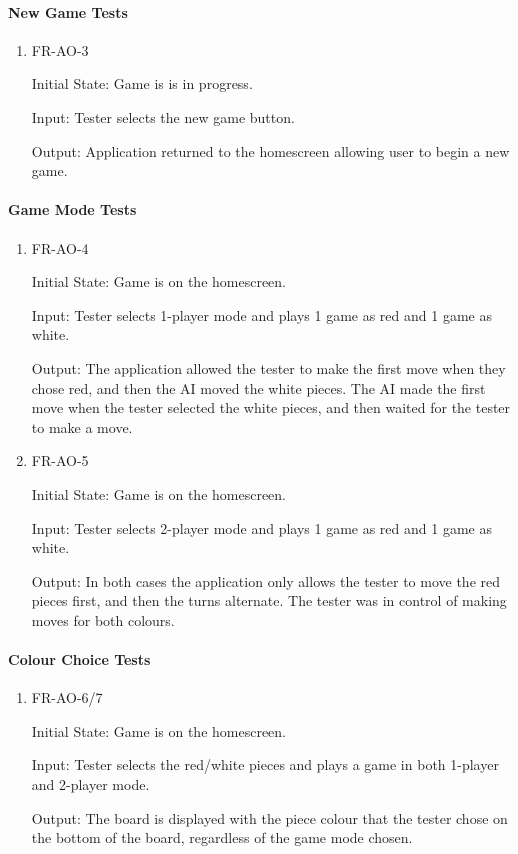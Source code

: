 \documentclass[12pt, titlepage]{article}
\begin{document}
\paragraph{New Game Tests}
\begin{enumerate}
    \item{FR-AO-3}
            
    Initial State: Game is is in progress.
    
    Input: Tester selects the new game button.
    
    Output: Application returned to the homescreen allowing user to begin a new game.
\end{enumerate}

\paragraph{Game Mode Tests}
\begin{enumerate}
    \item{FR-AO-4}
            
    Initial State: Game is on the homescreen.
    
    Input: Tester selects 1-player mode and plays 1 game as red and 1 game as white.
    
    Output: The application allowed the tester to make the first move when they chose red, and then the AI moved the white pieces. The AI made the first move when the tester selected the white pieces, and then waited for the tester to make a move. 
    \item{FR-AO-5}
                
    Initial State: Game is on the homescreen.
    
    Input: Tester selects 2-player mode and plays 1 game as red and 1 game as white.
    
    Output: In both cases the application only allows the tester to move the red pieces first, and then the turns alternate. The tester was in control of making moves for both colours.
\end{enumerate}

\paragraph{Colour Choice Tests}
\begin{enumerate}
    \item{FR-AO-6/7}
                
    Initial State: Game is on the homescreen.
    
    Input: Tester selects the red/white pieces and plays a game in both 1-player and 2-player mode.
    
    Output: The board is displayed with the piece colour that the tester chose on the bottom of the board, regardless of the game mode chosen.
\end{enumerate}
\end{document}
